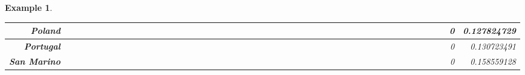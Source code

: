 \documentclass[a4paper,11pt]{report}
\newtheorem{example}[theorem]{Example}
\begin{document}
\begin{example}
\begin{appendices}
\begin{landscape}
\begin{longtable}{r|r|r|r|r|r|r|r|r|r|r|r|r|r|r|r|r|r|r|r|r|r|r|r|r|r|r|r|r|r|r|r|r|r|r|r|r|r|r|r|r|r|r|r|r|r|r|r|}
\multicolumn{1}{|r|}{\textbf{Poland}}                &                  &                  &                  &                     &                  &                  &                                &                   &                  &                 &                  &                  &                           &                  &                 &                  &                  &                 &                  &                  &                  &                 &                &                 &                    &                &                  &                 &                 &                   &                  &                 &                     &                 &                   &                   &                &                 &                      &                          &                 &                  &                         &                 &                & 0                        & 0.127824729        \\ \hline
\multicolumn{1}{|r|}{\textbf{Portugal}}              &                  &                  &                  &                     &                  &                  &                                &                   &                  &                 &                  &                  &                           &                  &                 &                  &                  &                 &                  &                  &                  &                 &                &                 &                    &                &                  &                 &                 &                   &                  &                 &                     &                 &                   &                   &                &                 &                      &                          &                 &                  &                         &                 &                & 0                        & 0.130723491        \\ \hline
\multicolumn{1}{|r|}{\textbf{San Marino}}            &                  &                  &                  &                     &                  &                  &                                &                   &                  &                 &                  &                  &                           &                  &                 &                  &                  &                 &                  &                  &                  &                 &                &                 &                    &                &                  &                 &                 &                   &                  &                 &                     &                 &                   &                   &                &                 &                      &                          &                 &                  &                         &                 &                & 0                        & 0.158559128        \\ \hline

\end{longtable}
\end{landscape}
\end{appendices}
\end{example}
\end{document}
